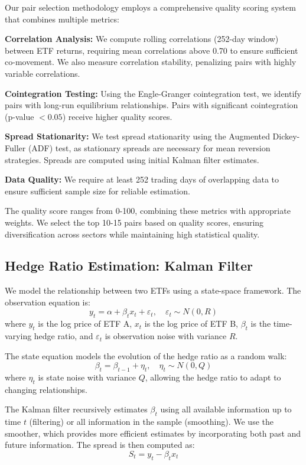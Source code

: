 \documentclass[12pt]{article}
\begin{document}
Our pair selection methodology employs a comprehensive quality scoring system that combines multiple metrics:

\textbf{Correlation Analysis:} We compute rolling correlations (252-day window) between ETF returns, requiring mean correlations above 0.70 to ensure sufficient co-movement. We also measure correlation stability, penalizing pairs with highly variable correlations.

\textbf{Cointegration Testing:} Using the Engle-Granger cointegration test, we identify pairs with long-run equilibrium relationships. Pairs with significant cointegration (p-value $< 0.05$) receive higher quality scores.

\textbf{Spread Stationarity:} We test spread stationarity using the Augmented Dickey-Fuller (ADF) test, as stationary spreads are necessary for mean reversion strategies. Spreads are computed using initial Kalman filter estimates.

\textbf{Data Quality:} We require at least 252 trading days of overlapping data to ensure sufficient sample size for reliable estimation.

The quality score ranges from 0-100, combining these metrics with appropriate weights. We select the top 10-15 pairs based on quality scores, ensuring diversification across sectors while maintaining high statistical quality.

\subsection{Hedge Ratio Estimation: Kalman Filter}

We model the relationship between two ETFs using a state-space framework. The observation equation is:
\begin{equation}
y_t = \alpha + \beta_t x_t + \varepsilon_t, \quad \varepsilon_t \sim N(0, R)
\end{equation}
where $y_t$ is the log price of ETF A, $x_t$ is the log price of ETF B, $\beta_t$ is the time-varying hedge ratio, and $\varepsilon_t$ is observation noise with variance $R$.

The state equation models the evolution of the hedge ratio as a random walk:
\begin{equation}
\beta_t = \beta_{t-1} + \eta_t, \quad \eta_t \sim N(0, Q)
\end{equation}
where $\eta_t$ is state noise with variance $Q$, allowing the hedge ratio to adapt to changing relationships.

The Kalman filter recursively estimates $\beta_t$ using all available information up to time $t$ (filtering) or all information in the sample (smoothing). We use the smoother, which provides more efficient estimates by incorporating both past and future information. The spread is then computed as:
\begin{equation}
S_t = y_t - \beta_t x_t
\end{equation}
\end{document}

